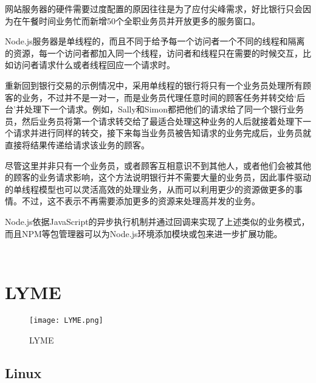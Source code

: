 网站服务器的硬件需要过度配置的原因往往是为了应付尖峰需求，好比银行只会因为在午餐时间业务忙而新增50个全职业务员并开放更多的服务窗口。

Node.js服务器是单线程的，而且不同于给予每一个访问者一个不同的线程和隔离的资源，每一个访问者都加入同一个线程，访问者和线程只在需要的时候交互，比如访问者请求什么或者线程回应一个请求时。

重新回到银行交易的示例情况中，采用单线程的银行将只有一个业务员处理所有顾客的业务，不过并不是一对一，而是业务员代理任意时间的顾客任务并转交给‘后台’并处理下一个请求。例如，Sally和Simon都把他们的请求给了同一个银行业务员，然后业务员将第一个请求转交给了最适合处理这种业务的人后就接着处理下一个请求并进行同样的转交，接下来每当业务员被告知请求的业务完成后，业务员就直接将结果传递给请求该业务的顾客。

尽管这里并非只有一个业务员，或者顾客互相意识不到其他人，或者他们会被其他的顾客的业务请求影响，这个方法说明银行并不需要大量的业务员，因此事件驱动的单线程模型也可以灵活高效的处理业务，从而可以利用更少的资源做更多的事情。不过，这不表示不再需要添加更多的资源来处理高并发的业务。

Node.js依据JavaScript的异步执行机制并通过回调来实现了上述类似的业务模式，而且NPM等包管理器可以为Node.js环境添加模块或包来进一步扩展功能。





\begin{lstlisting}[language=bash]

\end{lstlisting}




\begin{lstlisting}[language=bash]

\end{lstlisting}


\chapter{LYME}


\begin{figure}[htbp]
\centering
\texttt{[image: LYME.png]}
\caption{LYME}
\end{figure}




\section{Linux}


\begin{lstlisting}[language=bash]

\end{lstlisting}




